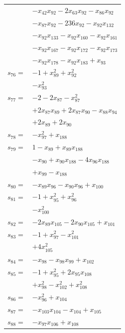 \begin{longtable}{@{}r@{\;}l@{}}
 & \(\displaystyle -x_{42}x_{92} -2x_{63}x_{92} -x_{86}x_{92}\) \\
 & \(\displaystyle -x_{87}x_{92} -236x_{92} -x_{92}x_{132}\) \\
 & \(\displaystyle -x_{92}x_{133} -x_{92}x_{160} -x_{92}x_{161}\) \\
 & \(\displaystyle -x_{92}x_{167} -x_{92}x_{172} -x_{92}x_{173}\) \\
 & \(\displaystyle -x_{92}x_{178} -x_{92}x_{183} +x_{93}\) \\[3pt]
\(s_{76}=\) & \(\displaystyle -1 +x_{89}^{2} +x_{92}^{2}\) \\
 & \(\displaystyle -x_{93}^{2}\) \\[3pt]
\(s_{77}=\) & \(\displaystyle -2 -2x_{87} -x_{87}^{2}\) \\
 & \(\displaystyle +2x_{87}x_{89} +2x_{87}x_{90} -x_{88}x_{94}\) \\
 & \(\displaystyle +2x_{89} +2x_{90}\) \\[3pt]
\(s_{78}=\) & \(\displaystyle -x_{97}^{2} +x_{188}\) \\[3pt]
\(s_{79}=\) & \(\displaystyle 1 -x_{89} +x_{89}x_{188}\) \\
 & \(\displaystyle -x_{90} +x_{90}x_{188} -4x_{96}x_{188}\) \\
 & \(\displaystyle +x_{99} -x_{188}\) \\[3pt]
\(s_{80}=\) & \(\displaystyle -x_{89}x_{96} -x_{90}x_{96} +x_{100}\) \\[3pt]
\(s_{81}=\) & \(\displaystyle -1 +x_{95}^{2} +x_{96}^{2}\) \\
 & \(\displaystyle -x_{100}^{2}\) \\[3pt]
\(s_{82}=\) & \(\displaystyle -2x_{89}x_{105} -2x_{90}x_{105} +x_{101}\) \\[3pt]
\(s_{83}=\) & \(\displaystyle -1 +x_{97}^{2} -x_{101}^{2}\) \\
 & \(\displaystyle +4x_{105}^{2}\) \\[3pt]
\(s_{84}=\) & \(\displaystyle -x_{98} -x_{98}x_{99} +x_{102}\) \\[3pt]
\(s_{85}=\) & \(\displaystyle -1 +x_{95}^{2} +2x_{95}x_{108}\) \\
 & \(\displaystyle +x_{98}^{2} -x_{102}^{2} +x_{108}^{2}\) \\[3pt]
\(s_{86}=\) & \(\displaystyle -x_{96}^{2} +x_{104}\) \\[3pt]
\(s_{87}=\) & \(\displaystyle -x_{103}x_{104} -x_{104} +x_{105}\) \\[3pt]
\(s_{88}=\) & \(\displaystyle -x_{97}x_{106} +x_{108}\) \\[3pt]

\end{longtable}
